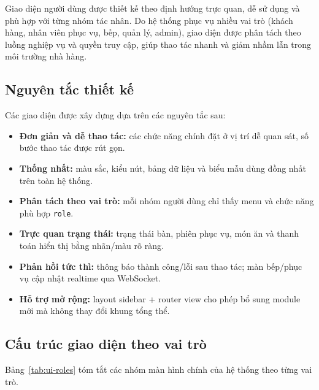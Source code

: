 \documentclass[../DoAn.tex]{subfiles}
\begin{document}
Giao diện người dùng được thiết kế theo định hướng trực quan, dễ sử dụng và phù hợp với từng nhóm tác nhân.
Do hệ thống phục vụ nhiều vai trò (khách hàng, nhân viên phục vụ, bếp, quản lý, admin),
giao diện được phân tách theo luồng nghiệp vụ và quyền truy cập, giúp thao tác nhanh và giảm nhầm lẫn
trong môi trường nhà hàng.

\subsection{Nguyên tắc thiết kế}

Các giao diện được xây dựng dựa trên các nguyên tắc sau:

\begin{itemize}
    \item \textbf{Đơn giản và dễ thao tác:} các chức năng chính đặt ở vị trí dễ quan sát, số bước thao tác được rút gọn.
    \item \textbf{Thống nhất:} màu sắc, kiểu nút, bảng dữ liệu và biểu mẫu dùng đồng nhất trên toàn hệ thống.
    \item \textbf{Phân tách theo vai trò:} mỗi nhóm người dùng chỉ thấy menu và chức năng phù hợp \texttt{role}.
    \item \textbf{Trực quan trạng thái:} trạng thái bàn, phiên phục vụ, món ăn và thanh toán hiển thị bằng nhãn/màu rõ ràng.
    \item \textbf{Phản hồi tức thì:} thông báo thành công/lỗi sau thao tác; màn bếp/phục vụ cập nhật realtime qua WebSocket.
    \item \textbf{Hỗ trợ mở rộng:} layout sidebar + router view cho phép bổ sung module mới mà không thay đổi khung tổng thể.
\end{itemize}

\subsection{Cấu trúc giao diện theo vai trò}

Bảng~\ref{tab:ui-roles} tóm tắt các nhóm màn hình chính của hệ thống theo từng vai trò.
\end{document}
